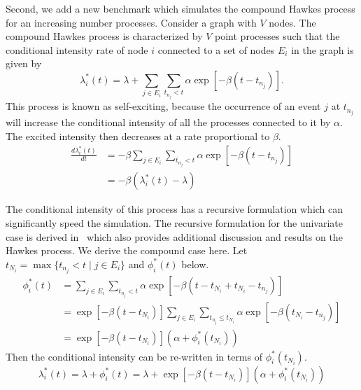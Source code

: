 \documentclass{juliacon}
\numberwithin{equation}{section}
\begin{document}
Second, we add a new benchmark which simulates the compound Hawkes process for an increasing number processes. Consider a graph with \( V \) nodes. The compound Hawkes process is characterized by \( V \) point processes such that the conditional intensity rate of node \( i \) connected to a set of nodes \( E_i \) in the graph is given by
\begin{equation} \label{eqn:hawkes-brute}
  \lambda_i^\ast (t) = \lambda + \sum_{j \in E_i} \sum_{t_{n_j} < t} \alpha \exp \left[-\beta (t - t_{n_j}) \right].
\end{equation}
This process is known as self-exciting, because the occurrence of an event \( j \) at \( t_{n_j} \) will increase the conditional intensity of all the processes connected to it by \( \alpha \). The excited intensity then decreases at a rate proportional to \( \beta \).
\begin{equation} \label{eqn:hawkes-derivative}
\begin{split}
  \frac{d \lambda_i^\ast (t)}{d t}
    &= -\beta \sum_{j \in E_i} \sum_{t_{n_j} < t} \alpha \exp \left[-\beta (t - t_{n_j}) \right] \\
    &= -\beta \left( \lambda_i^\ast (t) - \lambda \right)
\end{split}
\end{equation}

The conditional intensity of this process has a recursive formulation which can significantly speed the simulation. The recursive formulation for the univariate case is derived in~\cite{laub2021} which also provides additional discussion and results on the Hawkes process. We derive the compound case here. Let \( t_{N_i} = \max \{ t_{n_j} < t \mid j \in E_i \} \) and \( \phi_i^\ast (t) \) below.
\begin{equation}
\begin{split}
  \phi_i^\ast (t)
    &= \sum_{j \in E_i} \sum_{t_{n_j} < t} \alpha \exp \left[-\beta (t - t_{N_i} + t_{N_i} - t_{n_j}) \right] \\
    &= \exp \left[ -\beta (t - t_{N_i}) \right] \sum_{j \in E_i} \sum_{t_{n_j} \leq t_{N_i}} \alpha \exp \left[-\beta (t_{N_i} - t_{n_j}) \right] \\
    &= \exp \left[ -\beta (t - t_{N_i}) \right] \left( \alpha + \phi_i^\ast (t_{N_i}) \right)
\end{split}
\end{equation}
Then the conditional intensity can be re-written in terms of \( \phi_i^\ast (t_{N_i}) \).
\begin{equation} \label{eqn:hawkes-recursive}
  \lambda_i^\ast (t) = \lambda + \phi_i^\ast (t) = \lambda + \exp \left[ -\beta (t - t_{N_i}) \right] \left( \alpha + \phi_i^\ast (t_{N_i}) \right)
\end{equation}
\end{document}
